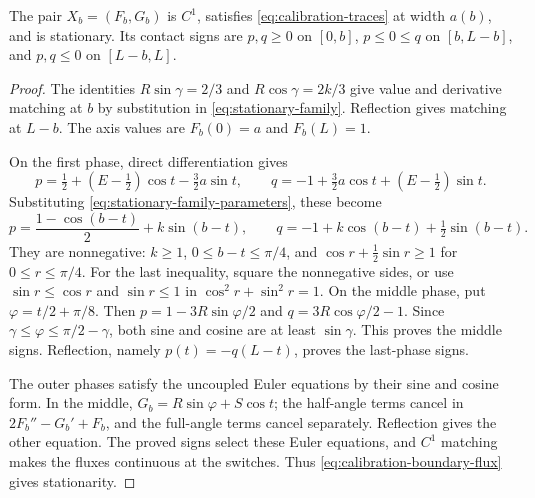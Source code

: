 \begin{lemma}\label{lem:stationary-family}
The pair $X_b=(F_b,G_b)$ is $C^1$, satisfies
\cref{eq:calibration-traces} at width $a(b)$, and is stationary.
Its contact signs are $p,q\ge0$ on $[0,b]$, $p\le0\le q$ on
$[b,L-b]$, and $p,q\le0$ on $[L-b,L]$.
\end{lemma}
\begin{proof}
The identities $R\sin\gamma=2/3$ and $R\cos\gamma=2k/3$
give value and derivative matching at $b$ by substitution in
\cref{eq:stationary-family}. Reflection gives matching at $L-b$.
The axis values are $F_b(0)=a$ and $F_b(L)=1$.

On the first phase, direct differentiation gives
\[
 p=\tfrac12+(E-\tfrac12)\cos t-\tfrac32a\sin t,
 \qquad q=-1+\tfrac32a\cos t+(E-\tfrac12)\sin t.
\]
Substituting \cref{eq:stationary-family-parameters}, these become
\[
 p=\frac{1-\cos(b-t)}2+k\sin(b-t),\qquad
 q=-1+k\cos(b-t)+\tfrac12\sin(b-t).
\]
They are nonnegative: $k\ge1$, $0\le b-t\le\pi/4$, and
$\cos r+\tfrac12\sin r\ge1$ for $0\le r\le\pi/4$.
For the last inequality, square the nonnegative sides, or use
$\sin r\le\cos r$ and $\sin r\le1$ in
$\cos^2r+\sin^2r=1$.
On the middle phase, put $\varphi=t/2+\pi/8$.
Then $p=1-3R\sin\varphi/2$ and $q=3R\cos\varphi/2-1$.
Since $\gamma\le\varphi\le\pi/2-\gamma$, both sine and cosine
are at least $\sin\gamma$. This proves the middle signs.
Reflection, namely $p(t)=-q(L-t)$, proves the last-phase signs.

The outer phases satisfy the uncoupled Euler equations by their
sine and cosine form. In the middle, $G_b=R\sin\varphi+S\cos t$;
the half-angle terms cancel in $2F_b''-G_b'+F_b$, and the
full-angle terms cancel separately. Reflection gives the other
equation. The proved signs select these Euler equations, and
$C^1$ matching makes the fluxes continuous at the switches.
Thus \cref{eq:calibration-boundary-flux} gives stationarity.
\end{proof}

